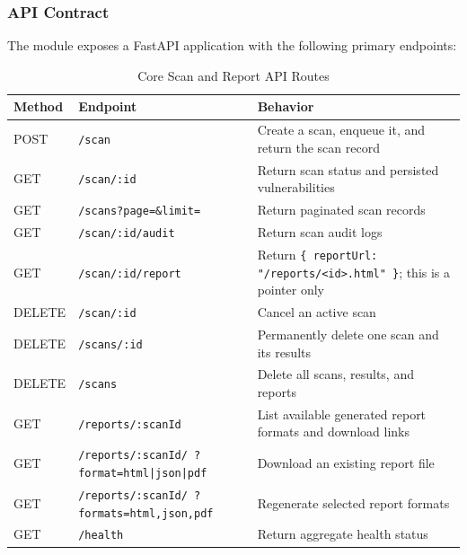 \subsubsection{API Contract}
The module exposes a FastAPI application with the following primary endpoints:
\begin{table}[h]
\centering
\renewcommand{\arraystretch}{1.2}
\begin{tabularx}{\textwidth}{|>{\raggedright\arraybackslash}p{2cm}|>{\raggedright\arraybackslash}p{5.5cm}|X|}
\hline
\textbf{Method} & \textbf{Endpoint} & \textbf{Behavior} \\
\hline

POST & \texttt{/scan} & Create a scan, enqueue it, and return the scan record \\
\hline

GET & \texttt{/scan/:id} & Return scan status and persisted vulnerabilities \\
\hline

GET & \texttt{/scans?page=\&limit=} & Return paginated scan records \\
\hline

GET & \texttt{/scan/:id/audit} & Return scan audit logs \\
\hline

GET & \texttt{/scan/:id/report} & Return \texttt{\{ reportUrl: "/reports/<id>.html" \}}; this is a pointer only \\
\hline

DELETE & \texttt{/scan/:id} & Cancel an active scan \\
\hline

DELETE & \texttt{/scans/:id} & Permanently delete one scan and its results \\
\hline

DELETE & \texttt{/scans} & Delete all scans, results, and reports \\
\hline

GET & \texttt{/reports/:scanId} & List available generated report formats and download links \\
\hline

GET & \texttt{/reports/:scanId/ ?format=html|json|pdf} & Download an existing report file \\
\hline

GET & \texttt{/reports/:scanId/ ?formats=html,json,pdf} & Regenerate selected report formats \\
\hline

GET & \texttt{/health} & Return aggregate health status \\
\hline

\end{tabularx}
\caption{Core Scan and Report API Routes}
\label{tab:scan-report-routes}
\end{table}


